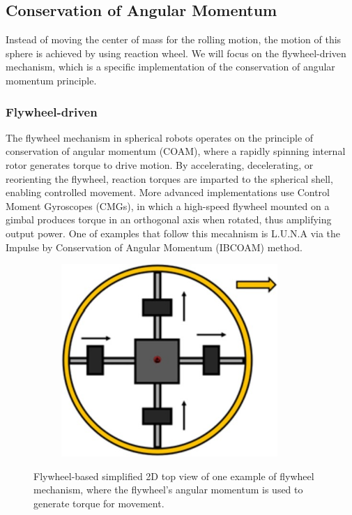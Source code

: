 \documentclass[english, bachelor, utf8]{base/thesis_telematics}
\begin{document}
\subsection{Conservation of Angular Momentum}
Instead of moving the center of mass for the rolling motion, the motion of this sphere is achieved by using reaction wheel. 
We will focus on the flywheel-driven mechanism, which is a specific implementation of the conservation of angular momentum principle.\cite{Aminata}
\subsubsection{Flywheel-driven}
The flywheel mechanism in spherical robots operates on the principle of conservation of angular momentum (COAM), where a rapidly spinning internal rotor generates torque to drive motion. By accelerating, decelerating, or reorienting the flywheel, reaction torques are imparted to the spherical shell, enabling controlled movement.
More advanced implementations use Control Moment Gyroscopes (CMGs), in which a high-speed flywheel mounted on a gimbal produces torque in an orthogonal axis when rotated, thus amplifying output power.
One of examples that follow this mecahnism is L.U.N.A\cite{luna} via the Impulse by Conservation of Angular Momentum (IBCOAM) method.

\begin{figure}[ht]
        \centering

\begin{subfigure}{0.48\textwidth}

    \centering
    \includegraphics[width=0.9\textwidth]{pics/flywheel_2D_top.jpg}
    \label{fig:flywheel_2D_top}
\end{subfigure}
\caption{Flywheel-based simplified 2D top view of one example of flywheel mechanism, where the flywheel's angular momentum is used to generate torque for movement.~\cite{SpheriDrive}}
\label{fig:flywheel_sphere}
\end{figure}
\end{document}
